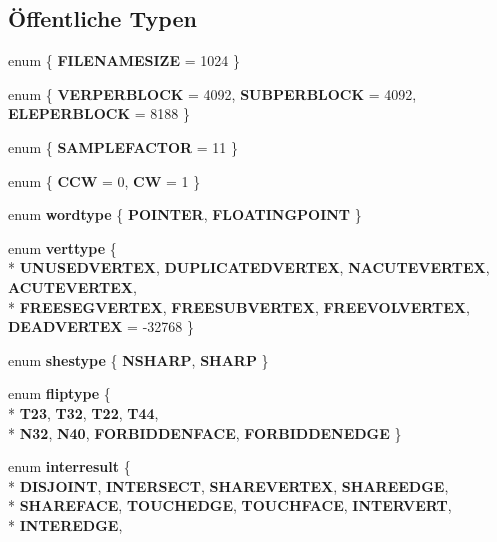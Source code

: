 \subsection*{Öffentliche Typen}
\begin{DoxyCompactItemize}
\item 
enum \{ {\bfseries F\-I\-L\-E\-N\-A\-M\-E\-S\-I\-Z\-E} = 1024
 \}
\item 
enum \{ {\bfseries V\-E\-R\-P\-E\-R\-B\-L\-O\-C\-K} = 4092, 
{\bfseries S\-U\-B\-P\-E\-R\-B\-L\-O\-C\-K} = 4092, 
{\bfseries E\-L\-E\-P\-E\-R\-B\-L\-O\-C\-K} = 8188
 \}
\item 
enum \{ {\bfseries S\-A\-M\-P\-L\-E\-F\-A\-C\-T\-O\-R} = 11
 \}
\item 
enum \{ {\bfseries C\-C\-W} = 0, 
{\bfseries C\-W} = 1
 \}
\item 
enum {\bfseries wordtype} \{ {\bfseries P\-O\-I\-N\-T\-E\-R}, 
{\bfseries F\-L\-O\-A\-T\-I\-N\-G\-P\-O\-I\-N\-T}
 \}
\item 
enum {\bfseries verttype} \{ \\*
{\bfseries U\-N\-U\-S\-E\-D\-V\-E\-R\-T\-E\-X}, 
{\bfseries D\-U\-P\-L\-I\-C\-A\-T\-E\-D\-V\-E\-R\-T\-E\-X}, 
{\bfseries N\-A\-C\-U\-T\-E\-V\-E\-R\-T\-E\-X}, 
{\bfseries A\-C\-U\-T\-E\-V\-E\-R\-T\-E\-X}, 
\\*
{\bfseries F\-R\-E\-E\-S\-E\-G\-V\-E\-R\-T\-E\-X}, 
{\bfseries F\-R\-E\-E\-S\-U\-B\-V\-E\-R\-T\-E\-X}, 
{\bfseries F\-R\-E\-E\-V\-O\-L\-V\-E\-R\-T\-E\-X}, 
{\bfseries D\-E\-A\-D\-V\-E\-R\-T\-E\-X} = -\/32768
 \}
\item 
enum {\bfseries shestype} \{ {\bfseries N\-S\-H\-A\-R\-P}, 
{\bfseries S\-H\-A\-R\-P}
 \}
\item 
enum {\bfseries fliptype} \{ \\*
{\bfseries T23}, 
{\bfseries T32}, 
{\bfseries T22}, 
{\bfseries T44}, 
\\*
{\bfseries N32}, 
{\bfseries N40}, 
{\bfseries F\-O\-R\-B\-I\-D\-D\-E\-N\-F\-A\-C\-E}, 
{\bfseries F\-O\-R\-B\-I\-D\-D\-E\-N\-E\-D\-G\-E}
 \}
\item 
enum {\bfseries interresult} \{ \\*
{\bfseries D\-I\-S\-J\-O\-I\-N\-T}, 
{\bfseries I\-N\-T\-E\-R\-S\-E\-C\-T}, 
{\bfseries S\-H\-A\-R\-E\-V\-E\-R\-T\-E\-X}, 
{\bfseries S\-H\-A\-R\-E\-E\-D\-G\-E}, 
\\*
{\bfseries S\-H\-A\-R\-E\-F\-A\-C\-E}, 
{\bfseries T\-O\-U\-C\-H\-E\-D\-G\-E}, 
{\bfseries T\-O\-U\-C\-H\-F\-A\-C\-E}, 
{\bfseries I\-N\-T\-E\-R\-V\-E\-R\-T}, 
\\*
{\bfseries I\-N\-T\-E\-R\-E\-D\-G\-E}, 

\end{DoxyCompactItemize}
